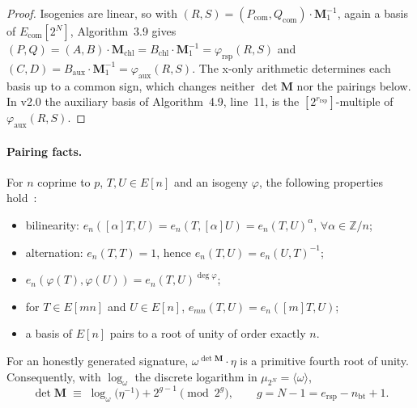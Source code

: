 \documentclass[version=submission]{iacrcc}
\newcommand{\ers}{e_{\mathrm{rsp}}}
\newcommand{\nbt}{n_{\mathrm{bt}}}
\newcommand{\rrs}{r_{\mathrm{rsp}}}
\newcommand{\Mm}{\mathbf{M}}
\newcommand{\Ecom}{E_{\mathrm{com}}}
\newcommand{\Z}{\mathbb{Z}}
\begin{document}
\begin{proof}
Isogenies are linear, so with $(R, S) = (P_{\mathrm{com}},
Q_{\mathrm{com}}) \cdot \Mm_1^{-1}$, again a basis of $\Ecom[2^N]$,
Algorithm~3.9 gives $(P, Q) = (A, B) \cdot \Mm_{\mathrm{chl}} =
B_{\mathrm{chl}} \cdot \Mm_1^{-1} = \varphi_{\mathrm{rsp}}(R, S)$ and
$(C, D) = B_{\mathrm{aux}} \cdot \Mm_1^{-1} = \varphi_{\mathrm{aux}}(R,
S)$. The x-only arithmetic determines each basis up to a common sign,
which changes neither $\det \Mm$ nor the pairings below. In v2.0 the
auxiliary basis of Algorithm~4.9, line~11, is the $[2^{\rrs}]$-multiple
of $\varphi_{\mathrm{aux}}(R, S)$.
\end{proof}

\paragraph{Pairing facts.}
For $n$ coprime to $p$, $T, U \in E[n]$ and an isogeny $\varphi$, the following properties hold~\cite[III.8.1 and III.8.2]{silverman}:
\begin{itemize}
    \item[(W1)] bilinearity: $e_n([\alpha]T,U) = e_n(T,[\alpha]U) = e_n(T,U)^{\alpha}$, $\forall\alpha \in \Z/n$;
    \item[(W2)] alternation: $e_n(T, T) = 1$, hence $e_n(T, U) = e_n(U, T)^{-1}$;
    \item[(W3)] $e_n(\varphi(T), \varphi(U)) = e_n(T, U)^{\deg \varphi}$;
    \item[(W4)] for $T \in E[mn]$ and $U \in E[n]$, $e_{mn}(T, U) = e_n([m] T, U)$;
    \item[(W5)] a basis of $E[n]$ pairs to a root of unity of order exactly $n$.
\end{itemize}

\begin{theorem}
\label{thm:main}
For an honestly generated signature, $\omega^{\det \Mm} \cdot \eta$ is a
primitive fourth root of unity. Consequently, with $\log_\omega$ the
discrete logarithm in $\mu_{2^N} = \langle \omega \rangle$,
\[
  \det \Mm \;\equiv\; \log_{\omega}\bigl(\eta^{-1}\bigr) + 2^{g - 1}
  \pmod{2^{g}}, \qquad g = N - 1 = \ers - \nbt + 1.
\]
\end{theorem}
\end{document}
